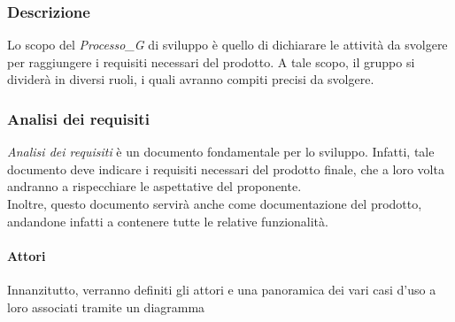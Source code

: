 \subsubsection{Descrizione}
Lo scopo del \textit{Processo_G} di sviluppo è quello di dichiarare le attività da svolgere per raggiungere i requisiti necessari del prodotto.
A tale scopo, il gruppo si dividerà in diversi ruoli, i quali avranno compiti precisi da svolgere.
\subsubsection{Analisi dei requisiti}
\textit{Analisi dei requisiti} è un documento fondamentale per lo sviluppo. Infatti, tale documento deve indicare i requisiti necessari del prodotto finale, che a loro volta andranno a rispecchiare le aspettative del proponente. \\
Inoltre, questo documento servirà anche come documentazione del prodotto, andandone infatti a contenere tutte le relative funzionalità.
\paragraph{Attori} 
Innanzitutto, verranno definiti gli attori e una panoramica dei vari casi d'uso a loro associati tramite un diagramma
